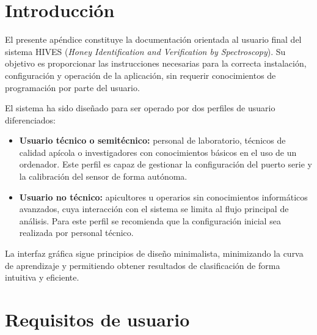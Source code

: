 
\section{Introducción}

El presente apéndice constituye la documentación orientada al usuario final del
sistema HIVES (\textit{Honey Identification and Verification by Spectroscopy}).
Su objetivo es proporcionar las instrucciones necesarias para la correcta
instalación, configuración y operación de la aplicación, sin requerir
conocimientos de programación por parte del usuario.

El sistema ha sido diseñado para ser operado por dos perfiles de usuario
diferenciados:

\begin{itemize}
    \item \textbf{Usuario técnico o semitécnico:} personal de laboratorio,
    técnicos de calidad apícola o investigadores con conocimientos básicos
    en el uso de un ordenador. Este perfil es capaz de gestionar la
    configuración del puerto serie y la calibración del sensor de forma
    autónoma.
    \item \textbf{Usuario no técnico:} apicultores u operarios sin
    conocimientos informáticos avanzados, cuya interacción con el sistema
    se limita al flujo principal de análisis. Para este perfil se recomienda
    que la configuración inicial sea realizada por personal técnico.
\end{itemize}

La interfaz gráfica sigue principios de diseño minimalista, minimizando la
curva de aprendizaje y permitiendo obtener resultados de clasificación de
forma intuitiva y eficiente.

\section{Requisitos de usuario}

